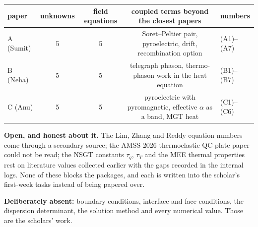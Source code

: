 \documentclass[11pt]{article}
\begin{document}
\begin{center}\footnotesize
\begin{tabular}{lcccl}
\toprule
paper & unknowns & field equations & coupled terms beyond the closest papers & numbers\\
\midrule
A (Sumit) & 5 & 5 & Soret--Peltier pair, pyroelectric, drift, recombination option & (A1)--(A7)\\
B (Neha) & 5 & 5 & telegraph phason, thermo-phason work in the heat equation & (B1)--(B7)\\
C (Anu) & 5 & 5 & pyroelectric with pyromagnetic, effective $\alpha$ as a band, MGT heat & (C1)--(C6)\\
\bottomrule
\end{tabular}
\end{center}

\noindent\textbf{Open, and honest about it.} The Lim, Zhang and Reddy equation numbers come through a
secondary source; the AMSS 2026 thermoelastic QC plate paper could not be read; the NSGT constants
$\tau_q$, $\tau_T$ and the MEE thermal properties rest on literature values collected earlier with the
gaps recorded in the internal logs. None of these blocks the packages, and each is written into the
scholar's first-week tasks instead of being papered over.

\noindent\textbf{Deliberately absent:} boundary conditions, interface and face conditions, the dispersion
determinant, the solution method and every numerical value. Those are the scholars' work.
\end{document}
